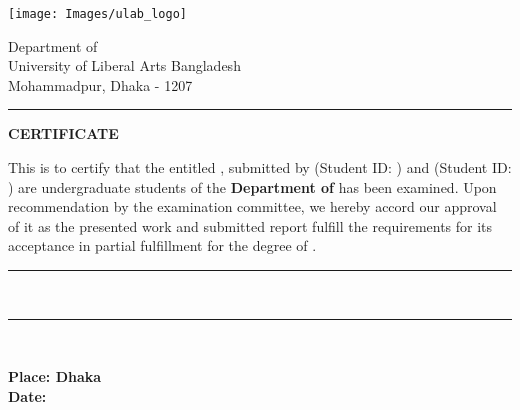 \thispagestyle{plain}
\noindent
\begin{minipage}{0.37\textwidth}
\texttt{[image: Images/ulab\_logo]}
\end{minipage}
\begin{minipage}{0.63\textwidth}

 Department of \Department \\
 University of Liberal Arts Bangladesh \\
 Mohammadpur, Dhaka - 1207
\end{minipage}

\vspace{0.5\baselineskip}
\hrule
\vspace{2\baselineskip}

\begin{center}
{\Large {\bf \uppercase{Certificate}}}
\end{center}

\vspace{\baselineskip}

\noindent This is to certify that the \MakeTextLowercase{\RoportType} entitled {\bf \ReportTitle}, submitted by {\bf \firstAuthor} (Student ID: {\textit{\firstAuthorID}}) and {\bf \secondAuthor} (Student ID: {\textit{\secondAuthorID}}) are undergraduate students of the {\bf Department of \Department} has been examined. Upon recommendation by the examination committee, we hereby accord our approval of it as the presented work and submitted report fulfill the requirements for its acceptance in partial fulfillment for the degree of \emph{\Degree}. 

\vspace{3\baselineskip}
\begin{flushright}
\begin{minipage}[c]{0.63\textwidth}
\centering
\hrule 
\vspace{0.5\baselineskip}
{\bf \Supervisor \\ \SupervisorPosition} \par
{}
\end{minipage}
\end{flushright}
\vspace{2\baselineskip}
\begin{flushright}
\begin{minipage}[c]{0.63\textwidth}
\centering
\hrule 
\vspace{0.5\baselineskip}
{\bf \HodName\\ \HodPosition} \par
{}
\end{minipage}
\end{flushright}
\vspace{\baselineskip}

\noindent
{\bf Place: Dhaka} \\
{\bf Date: \reportSubmissionDate}
